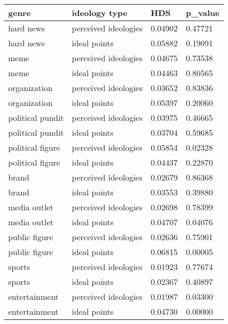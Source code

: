 \begin{table}
\centering
\begin{tabular}[t]{llll}
\toprule
genre & ideology type & HDS & p\_value\\
\midrule
hard news & perceived ideologies & 0.04902 & 0.47721\\
hard news & ideal points & 0.05882 & 0.19091\\
meme & perceived ideologies & 0.04675 & 0.73538\\
meme & ideal points & 0.04463 & 0.80565\\
organization & perceived ideologies & 0.03652 & 0.83836\\
organization & ideal points & 0.05397 & 0.20060\\
political pundit & perceived ideologies & 0.03975 & 0.46665\\
political pundit & ideal points & 0.03704 & 0.59685\\
political figure & perceived ideologies & 0.05854 & 0.02328\\
political figure & ideal points & 0.04437 & 0.22870\\
brand & perceived ideologies & 0.02679 & 0.86368\\
brand & ideal points & 0.03553 & 0.39880\\
media outlet & perceived ideologies & 0.02698 & 0.78399\\
media outlet & ideal points & 0.04707 & 0.04076\\
public figure & perceived ideologies & 0.02636 & 0.75901\\
public figure & ideal points & 0.06815 & 0.00005\\
sports & perceived ideologies & 0.01923 & 0.77674\\
sports & ideal points & 0.02367 & 0.40897\\
entertainment & perceived ideologies & 0.01987 & 0.03300\\
entertainment & ideal points & 0.04730 & 0.00000\\
\bottomrule
\end{tabular}
\end{table}
